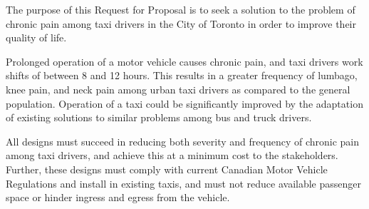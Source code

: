 The purpose of this Request for Proposal is to seek a solution to the
problem of chronic pain among taxi drivers in the City of Toronto in
order to improve their quality of life.

Prolonged operation of a motor vehicle causes chronic pain, and taxi
drivers work shifts of between 8 and 12 hours. This results in a
greater frequency of lumbago, knee pain, and neck pain among urban
taxi drivers as compared to the general population. Operation of a
taxi could be significantly improved by the adaptation of existing
solutions to similar problems among bus and truck drivers.

All designs must succeed in reducing both severity and frequency of
chronic pain among taxi drivers, and achieve this at a minimum cost to
the stakeholders. Further, these designs must comply with current
Canadian Motor Vehicle Regulations and install in existing taxis, and
must not reduce available passenger space or hinder ingress and
egress from the vehicle.
